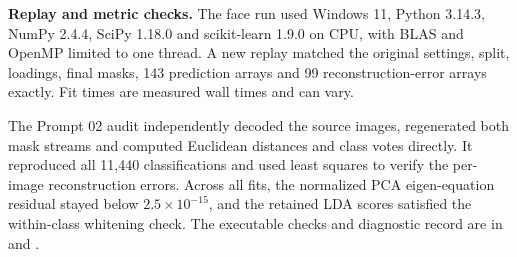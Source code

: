 \textbf{Replay and metric checks.}
The face run used Windows 11, Python 3.14.3, NumPy 2.4.4, SciPy 1.18.0 and scikit-learn 1.9.0 on CPU, with BLAS and OpenMP limited to one thread. A new replay matched the original settings, split, loadings, final masks, 143 prediction arrays and 99 reconstruction-error arrays exactly. Fit times are measured wall times and can vary.

The Prompt 02 audit independently decoded the source images, regenerated both mask streams and computed Euclidean distances and class votes directly. It reproduced all 11,440 classifications and used least squares to verify the per-image reconstruction errors. Across all fits, the normalized PCA eigen-equation residual stayed below $2.5\times10^{-15}$, and the retained LDA scores satisfied the within-class whitening check. The executable checks and diagnostic record are in  and .
